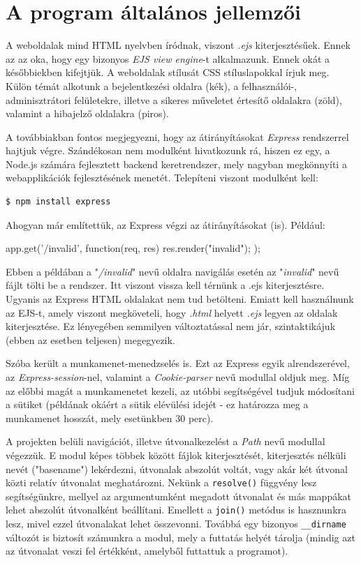 \section{A program általános jellemzői}

A weboldalak mind HTML nyelvben íródnak, viszont \textit{.ejs} kiterjesztésűek. Ennek az az oka, hogy egy bizonyos \textit{EJS view engine}-t alkalmazunk. Ennek okát a későbbiekben kifejtjük. A weboldalak stílusát CSS stíluslapokkal írjuk meg. Külön témát alkotunk a bejelentkezési oldalra (kék), a felhasználói-, adminisztrátori felületekre, illetve a sikeres műveletet értesítő oldalakra (zöld), valamint a hibajelző oldalakra (piros).

A továbbiakban fontos megjegyezni, hogy az átirányításokat \textit{Express} rendszerrel hajtjuk végre. Szándékosan nem modulként hivatkozunk rá, hiszen ez egy, a Node.js számára fejlesztett backend keretrendszer, mely nagyban megkönnyíti a webapplikációk fejlesztésének menetét. Telepíteni viszont modulként kell:

\begin{verbatim}
$ npm install express
\end{verbatim}

Ahogyan már említettük, az Express végzi az átirányításokat (is). Például:

\begin{javascript}
app.get('/invalid', function(req, res) {
  res.render("invalid");
});
\end{javascript}

Ebben a példában a "\textit{/invalid}" nevű oldalra navigálás esetén az "\textit{invalid}" nevű fájlt tölti be a rendszer. Itt viszont vissza kell térnünk a .ejs kiterjesztésre. Ugyanis az Express HTML oldalakat nem tud betölteni. Emiatt kell használnunk az EJS-t, amely viszont megköveteli, hogy \textit{.html} helyett \textit{.ejs} legyen az oldalak kiterjesztése. Ez lényegében semmilyen változtatással nem jár, szintaktikájuk (ebben az esetben teljesen) megegyezik.

Szóba került a munkamenet-menedzselés is. Ezt az Express egyik alrendszerével, az \textit{Express-session}-nel, valamint a \textit{Cookie-parser} nevű modullal oldjuk meg. Míg az előbbi magát a munkamenetet kezeli, az utóbbi segítségével tudjuk módosítani a sütiket (példának okáért a sütik elévülési idejét - ez határozza meg a munkamenet hosszát, mely esetünkben 30 perc).

A projekten belüli navigációt, illetve útvonalkezelést a \textit{Path} nevű modullal végezzük. E modul képes többek között fájlok kiterjesztését, kiterjesztés nélküli nevét ("basename") lekérdezni, útvonalak abszolút voltát, vagy akár két útvonal közti relatív útvonalat meghatározni. Nekünk a \texttt{resolve()} függvény lesz segítségünkre, mellyel az argumentumként megadott útvonalat és más mappákat lehet abszolút útvonalként beállítani. Emellett a \texttt{join()} metódus is hasznunkra lesz, mivel ezzel útvonalakat lehet összevonni. Továbbá egy bizonyos \texttt{\_\_dirname} változót is biztosít számunkra a modul, mely a futtatás helyét tárolja (mindig azt az útvonalat veszi fel értékként, amelyből futtattuk a programot).

